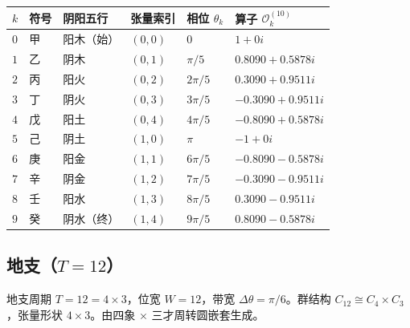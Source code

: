 \begin{center}
\begin{tabular}{>{\centering\arraybackslash}p{1cm}>{\centering\arraybackslash}p{1.2cm}>{\centering\arraybackslash}p{1.8cm}>{\centering\arraybackslash}p{1.8cm}>{\centering\arraybackslash}p{2cm}>{\centering\arraybackslash}p{3.5cm}}
\toprule
$k$ & 符号 & 阴阳五行 & 张量索引 & 相位 $\theta_k$ & 算子 $\mathcal{O}_k^{(10)}$ \\
\midrule
$0$ & 甲 & 阳木（始） & $(0,0)$ & $0$ & $1+0i$ \\
$1$ & 乙 & 阴木 & $(0,1)$ & $\pi/5$ & $0.8090+0.5878i$ \\
$2$ & 丙 & 阳火 & $(0,2)$ & $2\pi/5$ & $0.3090+0.9511i$ \\
$3$ & 丁 & 阴火 & $(0,3)$ & $3\pi/5$ & $-0.3090+0.9511i$ \\
$4$ & 戊 & 阳土 & $(0,4)$ & $4\pi/5$ & $-0.8090+0.5878i$ \\
$5$ & 己 & 阴土 & $(1,0)$ & $\pi$ & $-1+0i$ \\
$6$ & 庚 & 阳金 & $(1,1)$ & $6\pi/5$ & $-0.8090-0.5878i$ \\
$7$ & 辛 & 阴金 & $(1,2)$ & $7\pi/5$ & $-0.3090-0.9511i$ \\
$8$ & 壬 & 阳水 & $(1,3)$ & $8\pi/5$ & $0.3090-0.9511i$ \\
$9$ & 癸 & 阴水（终） & $(1,4)$ & $9\pi/5$ & $0.8090-0.5878i$ \\
\bottomrule
\end{tabular}
\end{center}

\subsection{\texorpdfstring{地支（$T=12$）}{地支（T=12）}}

\begin{definition}[地支相位算子]\label{def:dizhi_operators}
地支周期 $T=12=4 \times 3$，位宽 $W=12$，带宽 $\Delta\theta=\pi/6$。群结构 $C_{12} \cong C_4 \times C_3$，张量形状 $4 \times 3$。由四象 $\times$ 三才周转圆嵌套生成。
\end{definition}

